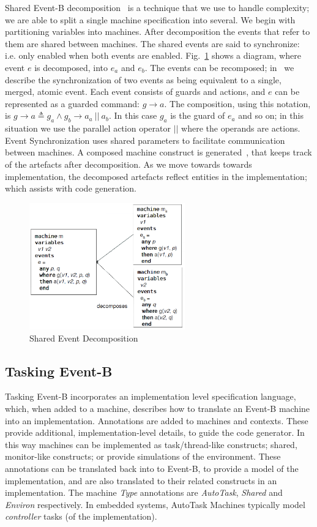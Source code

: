 \documentclass{llncs}%
\begin{document}
Shared Event-B decomposition~\cite{Butler09a,decomp2010b} is a technique that we use to handle complexity; we are able to split a single machine specification into several. We begin with partitioning variables into machines. After decomposition the events that refer to them are shared between machines. The shared events are said to synchronize: i.e. only enabled when both events are enabled. Fig.~\ref{fig:Decomp2} shows a diagram, where event $e$ is decomposed, into $e_a$ and $e_b$. The events can be recomposed; in~\cite{ae2011a} we describe the synchronization of two events as being equivalent to a single, merged, atomic event. Each event consists of guards and actions, and $e$ can be represented as a guarded command: $g \rightarrow a$. The composition, using this notation, is $g \rightarrow a \triangleq g_a \land g_b \rightarrow a_a~ ||~ a_b$. In this case $g_a$ is the guard of $e_a$ and so on; in this situation we use the parallel action operator $||$ where the operands are actions. Event Synchronization uses shared parameters to facilitate communication between machines.  A composed machine construct is generated~\cite{decomp2010c}, that keeps track of the artefacts after decomposition. As we move towards towards implementation, the decomposed artefacts reflect entities in the implementation; which assists with code generation.
%
\begin{figure}[t]
\centering
\includegraphics[width=0.6\textwidth]{Decomp2.png}
\caption{Shared Event Decomposition}
\label{fig:Decomp2}
\end{figure}
%
\subsection{Tasking Event-B}\label{TEB}
Tasking Event-B incorporates an implementation level specification language, which, when added to a machine, describes how to translate an Event-B machine into an implementation. Annotations are added to machines and contexts. These provide additional, implementation-level details, to guide the code generator. In this way machines can be implemented as task/thread-like constructs; shared, monitor-like constructs; or provide simulations of the environment. These annotations can be translated back into to Event-B, to provide a model of the implementation, and are also translated to their related constructs in an implementation. The machine \emph{Type} annotations are \emph{AutoTask}, \emph{Shared} and \emph{Environ} respectively.  In embedded systems, AutoTask Machines typically model \emph{controller} tasks (of the implementation). 
\end{document}
